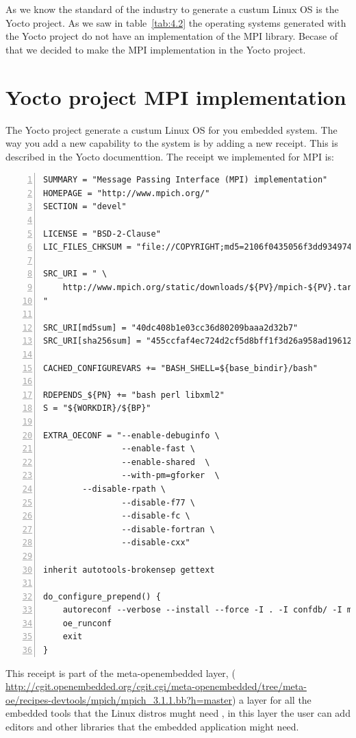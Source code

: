 As we know the standard of the industry to generate a custum Linux OS is the
Yocto project. As we saw in table~\ref{tab:4.2} the operating systems generated
with the Yocto project do not have an implementation of the MPI library. Becase
of that we decided to make the MPI implementation in the Yocto project. 


\section{Yocto project MPI implementation}

The Yocto project \cite{yocto-project} generate a custum Linux OS for you
embedded system. The way you add a new capability to the system is by adding a
new receipt. This is described in the Yocto documenttion. The receipt we
implemented for MPI is: 

\begin{lstlisting}[frame=single,numbers=left,breaklines=true]
SUMMARY = "Message Passing Interface (MPI) implementation"
HOMEPAGE = "http://www.mpich.org/"
SECTION = "devel"

LICENSE = "BSD-2-Clause"
LIC_FILES_CHKSUM = "file://COPYRIGHT;md5=2106f0435056f3dd9349747a766e5816"

SRC_URI = " \
	http://www.mpich.org/static/downloads/${PV}/mpich-${PV}.tar.gz \
"

SRC_URI[md5sum] = "40dc408b1e03cc36d80209baaa2d32b7"
SRC_URI[sha256sum] = "455ccfaf4ec724d2cf5d8bff1f3d26a958ad196121e7ea26504fd3018757652d"

CACHED_CONFIGUREVARS += "BASH_SHELL=${base_bindir}/bash"

RDEPENDS_${PN} += "bash perl libxml2"
S = "${WORKDIR}/${BP}"

EXTRA_OECONF = "--enable-debuginfo \
                --enable-fast \
                --enable-shared  \
                --with-pm=gforker  \
		--disable-rpath \
                --disable-f77 \
                --disable-fc \
                --disable-fortran \
                --disable-cxx"

inherit autotools-brokensep gettext

do_configure_prepend() {
    autoreconf --verbose --install --force -I . -I confdb/ -I maint/
    oe_runconf
    exit
}

\end{lstlisting}

This receipt is part of the meta-openembedded layer, (
\url{http://cgit.openembedded.org/cgit.cgi/meta-openembedded/tree/meta-oe/recipes-devtools/mpich/mpich_3.1.1.bb?h=master})
a layer for all the embedded tools that the Linux distros mught need , in this
layer the user can add editors and other libraries that the embedded
application might need. 

